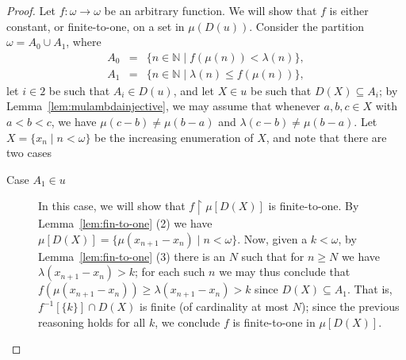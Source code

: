 \documentclass{amsart}
\theoremstyle{definition}
\theoremstyle{remark}
\numberwithin{equation}{section}
\begin{document}
\begin{proof}
Let $f:\omega\longrightarrow\omega$ be an arbitrary function. We will show that $f$ is either constant, or finite-to-one, on a set in $\mu(D(u))$. Consider the partition $\omega=A_0\cup A_1$, where
\begin{eqnarray*}
     A_0 & = & \{n\in\mathbb N \mid f(\mu(n))<\lambda(n)\}, \\
     A_1 & = & \{n\in\mathbb N \mid \lambda(n)\leq f(\mu(n))\},
\end{eqnarray*}
let $i\in 2$ be such that $A_i\in D(u)$, and let $X\in u$ be such that $D(X)\subseteq A_i$; by Lemma~\ref{lem:mulambdainjective}, we may assume that whenever $a,b,c\in X$ with $a<b<c$, we have $\mu(c-b)\neq\mu(b-a)$ and $\lambda(c-b)\neq\mu(b-a)$. Let $X=\{x_n \mid n<\omega\}$ be the increasing enumeration of $X$, and note that there are two cases

\begin{description}

\item[Case $A_1\in u$] In this case, we will show that $f\upharpoonright \mu[D(X)]$ is finite-to-one. By Lemma~\ref{lem:fin-to-one} (2) we have $\mu[D(X)]=\{\mu(x_{n+1}-x_n) \mid n<\omega\}$. Now, given a $k<\omega$, by Lemma~\ref{lem:fin-to-one} (3) there is an $N$ such that for $n\geq N$ we have $\lambda(x_{n+1}-x_n)>k$; for each such $n$ we may thus conclude that $f(\mu(x_{n+1}-x_n))\geq\lambda(x_{n+1}-x_n)>k$ since $D(X)\subseteq A_1$. That is, $f^{-1}[\{k\}]\cap D(X)$ is finite (of cardinality at most $N$); since the previous reasoning holds for all $k$, we conclude $f$ is finite-to-one in $\mu[D(X)]$.


\end{description}
\end{proof}
\end{document}

